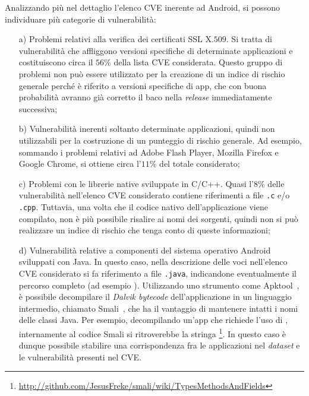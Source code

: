 \documentclass[12pt,a4paper,oneside]{article}
\begin{document}
Analizzando più nel dettaglio l'elenco \gls{CVE} inerente ad Android, si possono individuare più categorie di vulnerabilità:
\begin{enumerate}
    \item[a)]Problemi relativi alla verifica dei certificati SSL X.$509$. Si tratta di vulnerabilità che affliggono versioni specifiche di determinate applicazioni e costituiscono circa il $56\%$ della lista \gls{CVE} considerata. Questo gruppo di problemi non può essere utilizzato per la creazione di un indice di rischio generale perché è riferito a versioni specifiche di app, che con buona probabilità avranno già corretto il baco nella \textit{release} immediatamente successiva;
    \item[b)]Vulnerabilità inerenti soltanto determinate applicazioni, quindi non utilizzabili per la costruzione di un punteggio di rischio generale. Ad esempio, sommando i problemi relativi ad Adobe Flash Player, Mozilla Firefox e Google Chrome, si ottiene circa l'$11\%$ del totale considerato;
    \item[c)]Problemi con le librerie native sviluppate in \mbox{C/C++}. Quasi l'$8\%$ delle vulnerabilità nell'elenco \gls{CVE} considerato contiene riferimenti a file \texttt{.c} e/o \texttt{.cpp}. Tuttavia, una volta che il codice nativo dell'applicazione viene compilato, non è più possibile risalire ai nomi dei sorgenti, quindi non si può realizzare un indice di rischio che tenga conto di queste informazioni;
    \item[d)]Vulnerabilità relative a componenti del sistema operativo Android sviluppati con Java. In questo caso, nella descrizione delle voci nell'elenco \gls{CVE} considerato si fa riferimento a file \texttt{.java}, indicandone eventualmente il percorso completo (ad esempio ). Utilizzando uno strumento come Apktool~\cite{APKTOOL}, è possibile decompilare il \textit{Dalvik bytecode} dell'applicazione in un linguaggio intermedio, chiamato Smali~\cite{SMALI}, che ha il vantaggio di mantenere intatti i nomi delle classi Java. Per esempio, decompilando un'app che richiede l'uso di , internamente al codice Smali si ritroverebbe la stringa \footnote{\url{http://github.com/JesusFreke/smali/wiki/TypesMethodsAndFields}}. In questo caso è dunque possibile stabilire una corrispondenza fra le applicazioni nel \textit{dataset} e le vulnerabilità presenti nel \gls{CVE}.
\end{enumerate}
\end{document}
